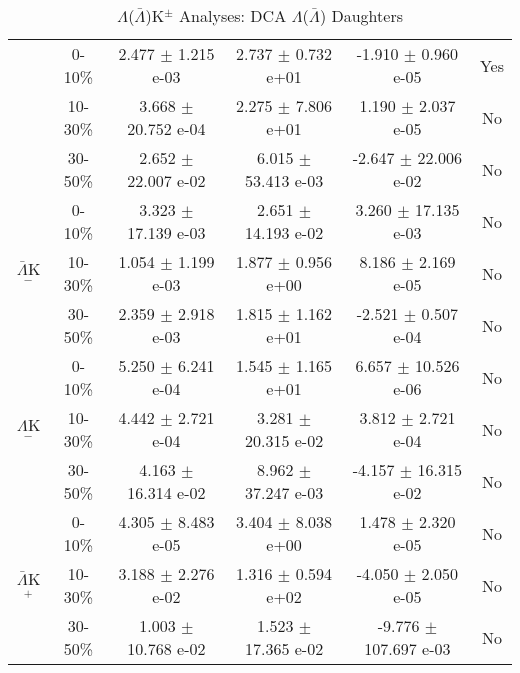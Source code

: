 \documentclass[../AnalysisNoteJBuxton.tex]{subfiles}
\begin{document}
\begin{table}
\begin{tabular}{|c|c|c|c|c|c|}
   &  0-10\% & 2.477 $\pm$ 1.215 e-03 & 2.737 $\pm$ 0.732 e+01 & -1.910 $\pm$ 0.960 e-05 & Yes \\
   & 10-30\% & 3.668 $\pm$ 20.752 e-04 & 2.275 $\pm$ 7.806 e+01 & 1.190 $\pm$ 2.037 e-05 & No \\
   & 30-50\% & 2.652 $\pm$ 22.007 e-02 & 6.015 $\pm$ 53.413 e-03 & -2.647 $\pm$ 22.006 e-02 & No \\
  \hline  
  \multirow{3}{*}{$\bar{\Lambda}$K$^{-}$}
   & 0-10\% & 3.323 $\pm$ 17.139 e-03 & 2.651 $\pm$ 14.193 e-02 & 3.260 $\pm$ 17.135 e-03 & No \\
   & 10-30\% & 1.054 $\pm$ 1.199 e-03 & 1.877 $\pm$ 0.956 e+00 & 8.186 $\pm$ 2.169 e-05 & No \\
   & 30-50\% & 2.359 $\pm$ 2.918 e-03 & 1.815 $\pm$ 1.162 e+01 & -2.521 $\pm$ 0.507 e-04 & No \\
  \hline \hline
  \multirow{3}{*}{$\Lambda$K$^{-}$}   
   &  0-10\% & 5.250 $\pm$ 6.241 e-04 & 1.545 $\pm$ 1.165 e+01 & 6.657 $\pm$ 10.526 e-06 & No \\
   & 10-30\% & 4.442 $\pm$ 2.721 e-04 & 3.281 $\pm$ 20.315 e-02 & 3.812 $\pm$ 2.721 e-04 & No \\
   & 30-50\% & 4.163 $\pm$ 16.314 e-02 & 8.962 $\pm$ 37.247 e-03 & -4.157 $\pm$ 16.315 e-02 & No \\
  \hline  
  \multirow{3}{*}{$\bar{\Lambda}$K$^{+}$}
   & 0-10\% & 4.305 $\pm$ 8.483 e-05 & 3.404 $\pm$ 8.038 e+00 & 1.478 $\pm$ 2.320 e-05 & No \\
   & 10-30\% & 3.188 $\pm$ 2.276 e-02 & 1.316 $\pm$ 0.594 e+02 & -4.050 $\pm$ 2.050 e-05 & No \\
   & 30-50\% & 1.003 $\pm$ 10.768 e-02 & 1.523 $\pm$ 17.365 e-02 & -9.776 $\pm$ 107.697 e-03 & No \\  
  \hline
 \end{tabular}
 \caption{$\Lambda$($\bar{\Lambda}$)K$^{\pm}$ Analyses: DCA $\Lambda$($\bar{\Lambda}$) Daughters}
 \label{tab:LamDaughtersDcaLamKchFull}
\end{table}
\end{document}
